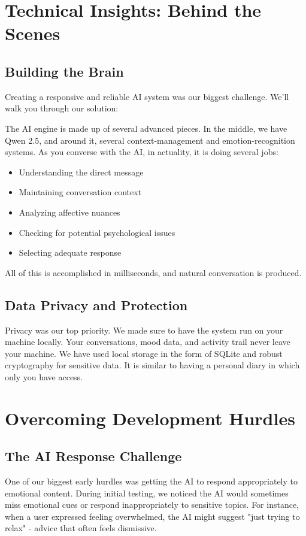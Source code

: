 \documentclass[12pt]{article}
\begin{document}
\section{Technical Insights: Behind the Scenes}

\subsection{Building the Brain}
Creating a responsive and reliable AI system was our biggest challenge. We'll walk you through our solution:

The AI engine is made up of several advanced pieces. In the middle, we have Qwen 2.5, and around it, several context-management and emotion-recognition systems. As you converse with the AI, in actuality, it is doing several jobs:
\begin{itemize}
    \item Understanding the direct message
    \item Maintaining conversation context
    \item Analyzing affective nuances
    \item Checking for potential psychological issues
    \item Selecting adequate response
\end{itemize}

All of this is accomplished in milliseconds, and natural conversation is produced.

\subsection{Data Privacy and Protection}
Privacy was our top priority. We made sure to have the system run on your machine locally. Your conversations, mood data, and activity trail never leave your machine. We have used local storage in the form of SQLite and robust cryptography for sensitive data. It is similar to having a personal diary in which only you have access.

\section{Overcoming Development Hurdles}

\subsection{The AI Response Challenge}
One of our biggest early hurdles was getting the AI to respond appropriately to emotional content. During initial testing, we noticed the AI would sometimes miss emotional cues or respond inappropriately to sensitive topics. For instance, when a user expressed feeling overwhelmed, the AI might suggest "just trying to relax" - advice that often feels dismissive.
\end{document}
